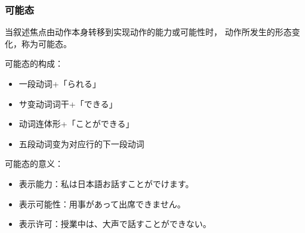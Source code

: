 \subsubsection{可能态}%

当叙述焦点由动作本身转移到实现动作的能力或可能性时，
动作所发生的形态变化，称为可能态。

可能态的构成：
\begin{itemize}
  \item 一段动词+「られる」
  \item サ变动词词干+「できる」
  \item 动词连体形+「ことができる」
  \item 五段动词变为对应行的下一段动词
\end{itemize}

可能态的意义：
\begin{itemize}
  \item 表示能力：私は日本語お話すことがでけます。
  \item 表示可能性：用事があって出席できません。
  \item 表示许可：授業中は、大声で話すことができない。
\end{itemize}
